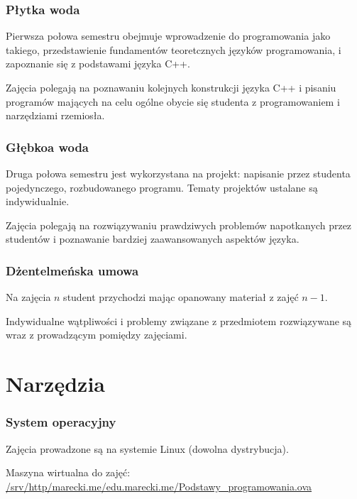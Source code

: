 \documentclass[aspectratio=169]{beamer}
\begin{document}
\begin{frame}
    \frametitle{Płytka woda}

    Pierwsza połowa semestru obejmuje wprowadzenie do programowania jako
    takiego, przedstawienie fundamentów teoretcznych języków programowania, i
    zapoznanie się z podstawami języka C++.

    \vspace{1em}

    Zajęcia polegają na poznawaniu kolejnych konstrukcji języka C++ i pisaniu
    programów mających na celu ogólne obycie się studenta z programowaniem i
    narzędziami rzemiosła.
\end{frame}

\begin{frame}
    \frametitle{Głębkoa woda}

    Druga połowa semestru jest wykorzystana na projekt: napisanie przez studenta
    pojedynczego, rozbudowanego programu. Tematy projektów ustalane są
    indywidualnie.

    \vspace{1em}

    Zajęcia polegają na rozwiązywaniu prawdziwych problemów napotkanych przez
    studentów i poznawanie bardziej zaawansowanych aspektów języka.
\end{frame}

\begin{frame}
    \frametitle{Dżentelmeńska umowa}

    Na zajęcia $n$ student przychodzi mając opanowany materiał z zajęć $n-1$.

    \vspace{1em}

    Indywidualne wątpliwości i problemy związane z przedmiotem rozwiązywane są
    wraz z prowadzącym pomiędzy zajęciami.
\end{frame}

\section{Narzędzia}

\begin{frame}
    \frametitle{System operacyjny}

    Zajęcia prowadzone są na systemie Linux (dowolna dystrybucja).

    {\tiny Maszyna wirtualna do zajęć:
    \url{/srv/http/marecki.me/edu.marecki.me/Podstawy_programowania.ova}}
\end{frame}
\end{document}
